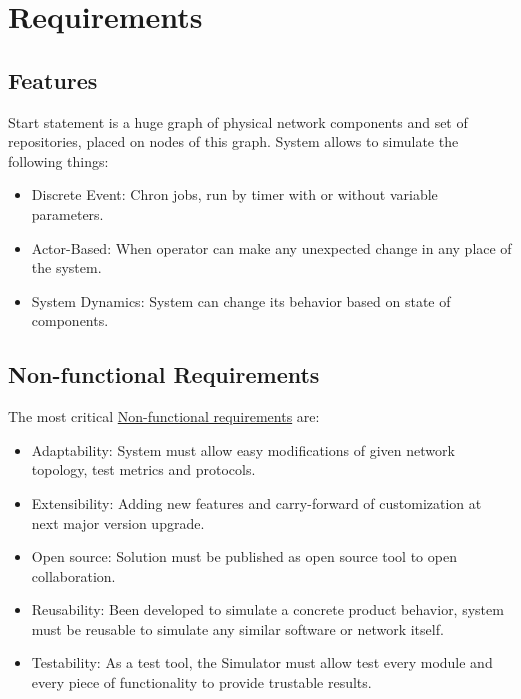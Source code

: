 \documentclass[12pt,oneside]{article}
\begin{document}
                      \section{Requirements}
                      \label{sec:requirements}

                      \subsection{Features}
                      \label{sec:features}
                      Start statement is a huge graph of physical network components and set of repositories, placed on nodes of this graph. System allows to simulate the following things:
                      \begin{itemize}
                          \item Discrete Event: Chron jobs, run by timer with or without variable parameters.
                          \item Actor-Based: When operator can make any unexpected change in any place of the system.
                          \item System Dynamics: System can change its behavior based on state of components.
                      \end{itemize}

                      \subsection{Non-functional Requirements}
                      \label{sec:nfr}
                      The most critical
                      \href{https://en.wikipedia.org/wiki/Non-functional_requirement}{Non-functional requirements}
                      are:
                      \begin{itemize}
                          \item Adaptability: System must allow easy modifications of given network topology, test metrics and protocols.
                          \item Extensibility: Adding new features and carry-forward of customization at next major version upgrade.
                          \item Open source: Solution must be published as open source tool to open collaboration.
                          \item Reusability: Been developed to simulate a concrete product behavior, system must be reusable to simulate any similar software or network itself.
                          \item Testability: As a test tool, the Simulator must allow test every module and every piece of functionality to provide trustable results.
                      \end{itemize}
\end{document}
